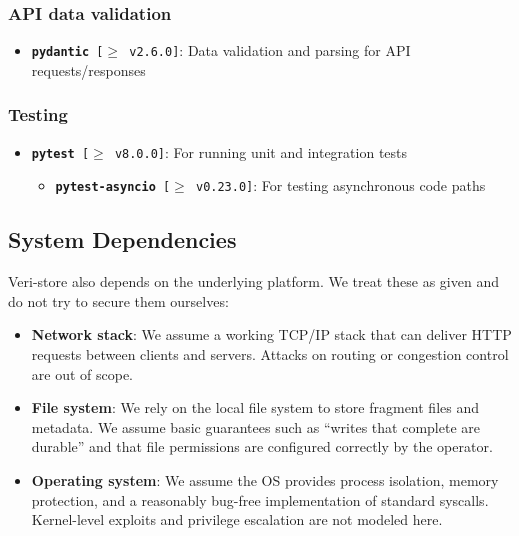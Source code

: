 \documentclass[../veristore_security_model.tex]{subfiles}
\begin{document}
\subsubsection*{API data validation}
\begin{itemize}
    \item \texttt{\textbf{pydantic} [$\geq$ v2.6.0]}: Data validation and parsing for API requests/responses
\end{itemize}

\subsubsection*{Testing}
\begin{itemize}
    \item \texttt{\textbf{pytest} [$\geq$ v8.0.0]}: For running unit and integration tests
    \begin{itemize}
        \item \texttt{\textbf{pytest-asyncio} [$\geq$ v0.23.0]}: For testing asynchronous code paths
    \end{itemize}
\end{itemize}

\subsection{System Dependencies}
Veri-store also depends on the underlying platform. We treat these as given and do not try to secure them ourselves:
\begin{itemize}
    \item \textbf{Network stack}: We assume a working TCP/IP stack that can deliver HTTP requests between clients and servers. Attacks on routing or congestion control are out of scope.
    \item \textbf{File system}: We rely on the local file system to store fragment files and metadata. We assume basic guarantees such as ``writes that complete are durable'' and that file permissions are configured correctly by the operator.
    \item \textbf{Operating system}: We assume the OS provides process isolation, memory protection, and a reasonably bug-free implementation of standard syscalls. Kernel-level exploits and privilege escalation are not modeled here.
\end{itemize}

\newpage
\end{document}
